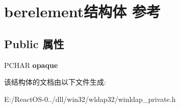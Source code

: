 \hypertarget{structberelement}{}\section{berelement结构体 参考}
\label{structberelement}
\subsection*{Public 属性}
\begin{DoxyCompactItemize}
\item 
\mbox{\label{structberelement_a94ea8ec87edf62c369a753cd33c8ff8b}} 
P\+C\+H\+AR {\bfseries opaque}
\end{DoxyCompactItemize}


该结构体的文档由以下文件生成\+:\begin{DoxyCompactItemize}
\item 
E\+:/\+React\+O\+S-\/0../dll/win32/wldap32/winldap\+\_\+private.\+h\end{DoxyCompactItemize}
